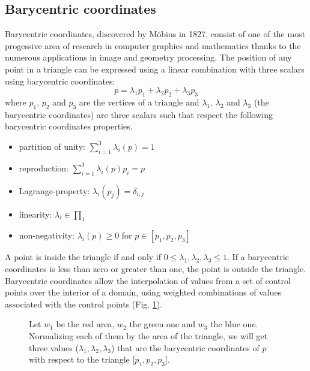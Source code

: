 \subsection{Barycentric coordinates}
Barycentric coordinates, discovered by M\"obius in 1827, consist of one of the most progessive area of research in computer graphics and mathematics thanks to the numerous applications in image and geometry processing.
\cite{REPORT:localbarycentricoordsepfl}
The position of any point in a triangle can be expressed using a linear combination with three scalars using barycentric coordinates:
$$ p = \lambda_1 p_1 + \lambda_2 p_2 + \lambda_3 p_3$$
where $p_1$, $p_2$ and $p_3$ are the vertices of a triangle and $\lambda_1$, $\lambda_2$ and $\lambda_3$ (the barycentric coordinates) are three scalars such that
respect the following barycentric coordinates properties.\cite{SLIDE:ICORSI}
\begin{itemize}
  \item partition of unity: $\sum_{i=1}^3 \lambda_{i}(p) = 1$
  \item reproduction: $\sum_{i=1}^3 \lambda_{i}(p)p_i = p$
  \item Lagrange-property: $\lambda_i(p_j) = \delta_{i, j}$
  \item linearity: $\lambda_i \in \prod_1$
  \item non-negativity: $\lambda_i(p)\geq 0$ for $p \in [p_1, p_2, p_3]$
\end{itemize}

A point is inside the triangle if and only if $0 \leq \lambda_1, \lambda_2, \lambda_3 \leq 1$. If a barycentric coordinates is less than zero or greater than one, the point is outside the triangle.
Barycentric coordinates allow the interpolation of values from a set of control points over the interior of a domain, using weighted combinations of values associated with the control points (Fig. \ref{fig:barycentric-coord}).
\cite{REPORT:localbarycentricoordsepfl}
\begin{figure}
  \centering
    \caption{Let $w_1$ be the red area, $w_2$ the green one and $w_3$ the blue one. Normalizing each of them by the area of the triangle, we will get three values ($\lambda_1, \lambda_2, \lambda_3$) that are the barycentric coordinates of $p$ with respect to the triangle [$p_1, p_2, p_3$].}
    \label{fig:barycentric-coord}
  \end{figure}

